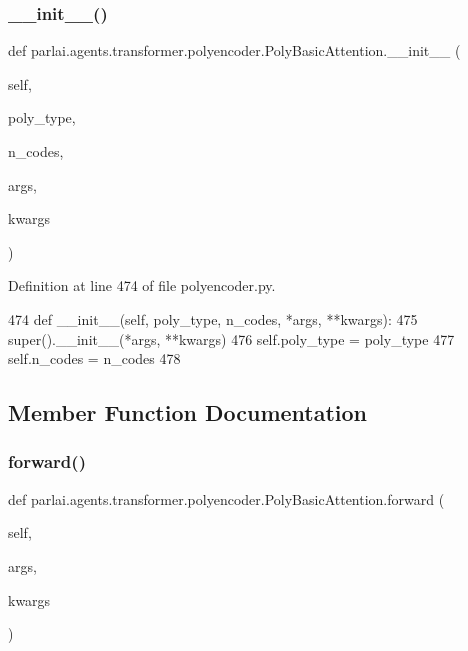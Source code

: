 \subsubsection{\texorpdfstring{\+\_\+\+\_\+init\+\_\+\+\_\+()}{\_\_init\_\_()}}
{\footnotesize\ttfamily def parlai.\+agents.\+transformer.\+polyencoder.\+Poly\+Basic\+Attention.\+\_\+\+\_\+init\+\_\+\+\_\+ (\begin{DoxyParamCaption}\item[{}]{self,  }\item[{}]{poly\+\_\+type,  }\item[{}]{n\+\_\+codes,  }\item[{}]{args,  }\item[{}]{kwargs }\end{DoxyParamCaption})}



Definition at line 474 of file polyencoder.\+py.


\begin{DoxyCode}
474     \textcolor{keyword}{def }\_\_init\_\_(self, poly\_type, n\_codes, *args, **kwargs):
475         super().\_\_init\_\_(*args, **kwargs)
476         self.poly\_type = poly\_type
477         self.n\_codes = n\_codes
478 
\end{DoxyCode}


\subsection{Member Function Documentation}
\mbox{\label{classparlai_1_1agents_1_1transformer_1_1polyencoder_1_1PolyBasicAttention_a6927374c5336d0111ab936c1fd2b62ff}} 
\subsubsection{\texorpdfstring{forward()}{forward()}}
{\footnotesize\ttfamily def parlai.\+agents.\+transformer.\+polyencoder.\+Poly\+Basic\+Attention.\+forward (\begin{DoxyParamCaption}\item[{}]{self,  }\item[{}]{args,  }\item[{}]{kwargs }\end{DoxyParamCaption})}

